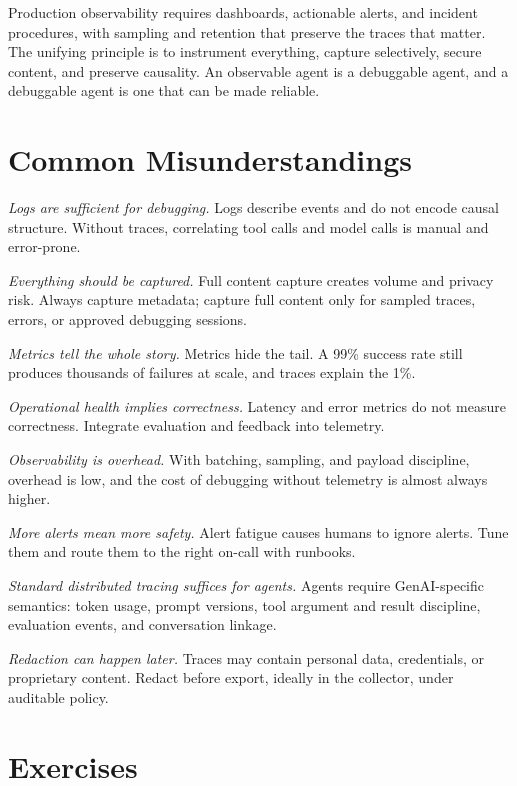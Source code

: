 \documentclass[11pt]{book}
\begin{document}
Production observability requires dashboards, actionable alerts, and incident procedures, with sampling and retention that preserve the traces that matter. The unifying principle is to instrument everything, capture selectively, secure content, and preserve causality. An observable agent is a debuggable agent, and a debuggable agent is one that can be made reliable.

\section{Common Misunderstandings}

\textit{Logs are sufficient for debugging.} Logs describe events and do not encode causal structure. Without traces, correlating tool calls and model calls is manual and error-prone.

\textit{Everything should be captured.} Full content capture creates volume and privacy risk. Always capture metadata; capture full content only for sampled traces, errors, or approved debugging sessions.

\textit{Metrics tell the whole story.} Metrics hide the tail. A 99\% success rate still produces thousands of failures at scale, and traces explain the 1\%.

\textit{Operational health implies correctness.} Latency and error metrics do not measure correctness. Integrate evaluation and feedback into telemetry.

\textit{Observability is overhead.} With batching, sampling, and payload discipline, overhead is low, and the cost of debugging without telemetry is almost always higher.

\textit{More alerts mean more safety.} Alert fatigue causes humans to ignore alerts. Tune them and route them to the right on-call with runbooks.

\textit{Standard distributed tracing suffices for agents.} Agents require GenAI-specific semantics: token usage, prompt versions, tool argument and result discipline, evaluation events, and conversation linkage.

\textit{Redaction can happen later.} Traces may contain personal data, credentials, or proprietary content. Redact before export, ideally in the collector, under auditable policy.

\section*{Exercises}
\end{document}
